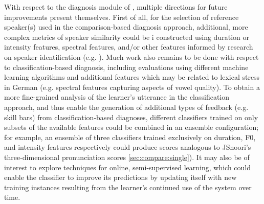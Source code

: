 	

	
	
	
	
	With respect to the diagnosis module of , multiple directions for future improvements present themselves. 
	First of all, for the selection of reference speaker(s) used in the comparison-based diagnosis approach, additional, more complex metrics of speaker similarity could be 
	i%
	constructed using duration or intensity features, spectral features, and/or other features informed by research on speaker identification (e.g. \cite{Shriberg2005}).
	Much work also remains to be done with respect to classification-based diagnosis, including evaluations using different machine learning algorithms and additional features which may be related to lexical stress in German (e.g. spectral features capturing aspects of vowel quality). To obtain a more fine-grained analysis of the learner's utterance in the classification approach, and thus enable the generation of additional types of feedback (e.g. skill bars) from classification-based diagnoses, different classifiers trained on only subsets of the available features could be combined in an ensemble configuration;
	for example, an ensemble of three classifiers trained exclusively on duration, F0, and intensity features respectively could produce scores analogous to JSnoori's three-dimensional pronunciation scores \cref{sec:compare:single}).
	 It may also be of interest to explore techniques for online, semi-supervised learning, which could enable the classifier to improve its predictions by updating itself with new training instances resulting from the learner's continued use of the system over time.
	
